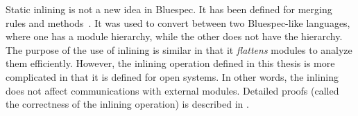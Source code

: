 Static inlining is not a new idea in Bluespec. It has been defined for
merging rules and methods~\cite{daniel-thesis}. It was used to convert
between two Bluespec-like languages, where one has a module hierarchy,
while the other does not have the hierarchy. The purpose of the use of
inlining is similar in that it \emph{flattens} modules to analyze them
efficiently. However, the inlining operation defined in this thesis is
more complicated in that it is defined for open systems. In other
words, the inlining does not affect communications with external
modules. Detailed proofs (called the correctness of the inlining
operation) is described in .


